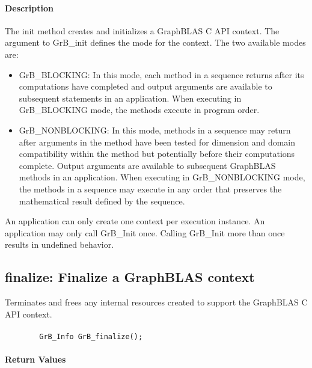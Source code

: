 \paragraph{Description}

The {\sf init} method creates and initializes a GraphBLAS C API context.  The argument
to {\sf GrB\_init} defines the mode for the context.  The two
available modes are:

\begin{itemize}
\item {\sf GrB\_BLOCKING}: In this mode, each method in a sequence returns after
its computations have completed and output arguments are available to
subsequent statements in an application.  When executing in {\sf
GrB\_BLOCKING} mode, the methods execute in program order.

\item {\sf GrB\_NONBLOCKING}: In this mode, methods in a sequence may return after arguments
in the method have been tested for dimension and domain compatibility
within the method but potentially before their computations complete.  Output
arguments are available to subsequent GraphBLAS methods in an application.
When executing in {\sf GrB\_NONBLOCKING} mode, the methods in a sequence
may execute in any order that preserves the mathematical result defined
by the sequence.
\end{itemize}

An application can only create one context per execution instance.  An application
may only call {\sf GrB\_Init} once.  Calling {\sf GrB\_Init} more
than once results in undefined behavior.

\subsection{{\sf finalize}: Finalize a GraphBLAS context}
\label{Sec:GrB_finalize}

Terminates and frees any internal resources created to support the
GraphBLAS C API context.

\paragraph{\syntax}

\begin{verbatim}
        GrB_Info GrB_finalize();
\end{verbatim}

\paragraph{Return Values}

